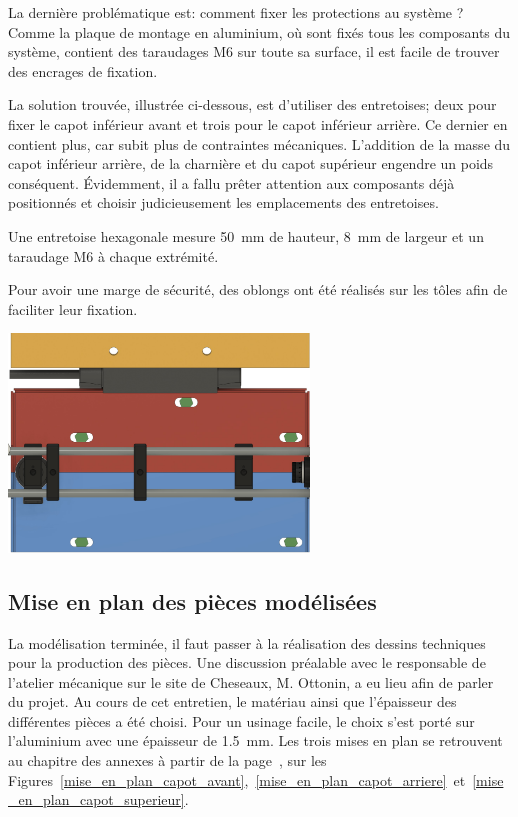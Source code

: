 \begin{minipage}{\textwidth}
    La dernière problématique est: comment fixer les protections au système ? Comme la plaque de montage en aluminium, où sont fixés tous les composants du système, contient des taraudages M6 sur toute sa surface, il est facile de trouver des encrages de fixation.

    La solution trouvée, illustrée ci-dessous, est d'utiliser des entretoises; deux pour fixer le capot inférieur avant et trois pour le capot inférieur arrière. Ce dernier en contient plus, car subit plus de contraintes mécaniques. L'addition de la masse du capot inférieur arrière, de la charnière et du capot supérieur engendre un poids conséquent. Évidemment, il a fallu prêter attention aux composants déjà positionnés et choisir judicieusement les emplacements des entretoises.

    Une entretoise hexagonale mesure 50~mm de hauteur, 8~mm de largeur et un taraudage M6 à chaque extrémité.

    Pour avoir une marge de sécurité, des oblongs ont été réalisés sur les tôles afin de faciliter leur fixation.
    \vspace{1em}
    \begin{center}
        \includegraphics[width=0.6\textwidth]{assets/figures/Protections_laser/Securite_mecanique/Protection_entree_laser/contrainte_entretoises.jpeg}
    \end{center}
    \label{contrainte_entretoises}
\end{minipage}

\subsection{Mise en plan des pièces modélisées}
La modélisation terminée, il faut passer à la réalisation des dessins techniques pour la production des pièces. Une discussion préalable avec le responsable de l'atelier mécanique sur le site de Cheseaux, M. Ottonin, a eu lieu afin de parler du projet. Au cours de cet entretien, le matériau ainsi que l'épaisseur des différentes pièces a été choisi. Pour un usinage facile, le choix s'est porté sur l'aluminium avec une épaisseur de 1.5~mm. Les trois mises en plan se retrouvent au chapitre des annexes à partir de la page~\pageref{Mises_En_Plan}, sur les Figures~\ref{mise_en_plan_capot_avant},~\ref{mise_en_plan_capot_arriere}~et~\ref{mise_en_plan_capot_superieur}.






